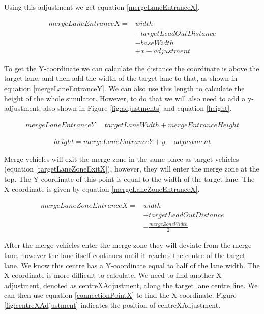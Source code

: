 Using this adjustment we get equation \ref{mergeLaneEntranceX}.

\begin{equation}\label{mergeLaneEntranceX}
	\begin{split}
mergeLaneEntranceX = & width \\
					 & - targetLeadOutDistance \\
					 & - baseWidth \\
					 & + x-adjustment
	\end{split}
\end{equation}{}

To get the Y-coordinate we can calculate the distance the coordinate is above the target lane, and then add the width of the target lane to that, as shown in equation \ref{mergeLaneEntranceY}. We can also use this length to calculate the height of the whole simulator. However, to do that we will also need to add a y-adjustment, also shown in Figure \ref{fig:adjustments} and equation \ref{height}. 

\begin{equation}\label{mergeLaneEntranceY}
	\begin{split}
mergeLaneEntranceY = targetLaneWidth + mergeEntranceHeight
	\end{split}
\end{equation}

\begin{equation}\label{height}
	\begin{split}
height = mergeLaneEntranceY + y-adjustment
	\end{split}
\end{equation}

Merge vehicles will exit the merge zone in the same place as target vehicles (equation \ref{targetLaneZoneExitX}), however, they will enter the merge zone at the top. The Y-coordinate of this point is equal to the width of the target lane. The X-coordinate is given by equation \ref{mergeLaneZoneEntranceX}.

\begin{equation}\label{mergeLaneZoneEntranceX}
	\begin{split}
mergeLaneZoneEntranceX = & width \\
						 & - targetLeadOutDistance \\
						 & - \frac{mergeZoneWidth}{2}
	\end{split}
\end{equation}

After the merge vehicles enter the merge zone they will deviate from the merge lane, however the lane itself continues until it reaches the centre of the target lane. We know this centre has a Y-coordinate equal to half of the lane width. The X-coordinate is more difficult to calculate. We need to find another X-adjustment, denoted as centreXAdjustment, along the target lane centre line. We can then use equation \ref{connectionPointX} to find the X-coordinate. Figure \ref{fig:centreXAdjustment} indicates the position of centreXAdjustment.

